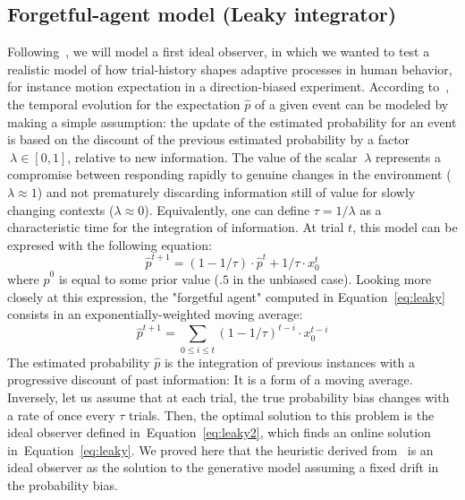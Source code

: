 \documentclass[profile,final,english,draft]{article}%
\newcommand{\choice}[1]{ %
	\left\{ %
		\begin{array}{l} #1 \end{array} %
	\right. }
\newcommand{\eql}[1]{\begin{equation}#1\end{equation}}
\newcommand{\citep}[1]{\parencite{#1}}
\newcommand{\citet}[1]{\textcite{#1}}
\newcommand{\seeEq}[1]{Equation~\ref{eq:#1}}
\begin{document}
\subsection{Forgetful-agent model (Leaky integrator)}
Following~\citep{Maus2015},
we will model a first ideal observer,
in which we wanted to test
a realistic model of how trial-history shapes
adaptive processes in human behavior,
for instance motion expectation in a direction-biased experiment.
According to~\citet{Anderson2006},
the temporal evolution for the expectation $\hat{p}$ of a given event
can be modeled by making a simple assumption:
the update of the estimated probability for an event is based
on the discount of the previous estimated probability
by a factor$~\lambda \in [0, 1]$, relative to new information.
The value of the scalar $~\lambda$ represents
a compromise between responding rapidly
to genuine changes in the environment ($\lambda \approx 1$) and
not prematurely discarding information still of value
for slowly changing contexts  ($\lambda \approx 0$).
Equivalently, one can define $\tau = 1 / \lambda$ as
a characteristic time for the integration of information.
At trial $t$, this model can be expresed with the following equation:
\eql{%
\hat{p}^{t+1} = (1 - 1/\tau) \cdot \hat{p}^{t} + 1/\tau \cdot x_0^t
\label{eq:leaky}}
where $\hat{p}^0$ is equal to some prior value ($.5$ in the unbiased case).
Looking more closely at this expression,
the "forgetful agent" computed in \seeEq{leaky}
consists in an exponentially-weighted moving average:
\eql{
\hat{p}^{t+1} = \sum_{0\leq i \leq t} (1 - 1/\tau)^{t-i} \cdot x_0^{t-i}
\label{eq:leaky2}}
The estimated  probability $\hat{p}$ is the integration of previous instances
with a progressive discount of past information:
It is a form of a moving average.
Inversely, let us assume that at each trial,
the true probability bias changes with a rate of once
every $\tau$ trials.
Then, the optimal solution to this problem is the
ideal observer defined in~\seeEq{leaky2},
which finds an online solution in~\seeEq{leaky}.
We proved here that the heuristic derived from~\citep{Anderson2006}
is an ideal observer as the solution
to the generative model assuming a fixed drift in the probability bias.
\end{document}
